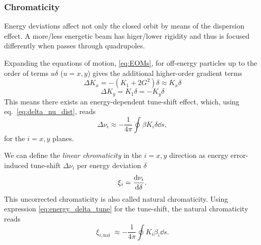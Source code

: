\subsubsection{Chromaticity}
Energy deviations affect not only the closed orbit by means of the dispersion effect. A more/less energetic beam has higer/lower rigidity and thus is focused differently when passes through quadrupoles.

Expanding the equations of motion, \eqref{eq:EOMs}, for off-energy particles up to the order of terms $u\delta$ ($u=x,y$) gives the additional higher-order gradient terms
\begin{equation}
    \Delta K_x = -(K_1+2G^2)\delta \approx K_x\delta
\end{equation}
\begin{equation}
    \Delta K_y = K_1\delta = -K_y\delta
\end{equation}
This means there exists an energy-dependent tune-shift effect, which, using eq.~\eqref{eq:delta_nu_dist}, reads
\begin{equation}
    \Delta \nu _i \approx -\frac{1}{4\pi}\oint\beta K_i \delta \dd{s},
    \label{eq:energy_delta_tune}
\end{equation}
for the $i=x,y$ planes.

We can define the \textit{linear chromaticity} in the $i=x,y$ direction as energy error-induced tune-shift $\Delta \nu_i$ per energy deviation $\delta$
\begin{equation}
    \xi_i=\dv{\nu_i}{\delta}.
\end{equation}
This uncorrected chromaticity is also called natural chromaticity. Using expression \eqref{eq:energy_delta_tune} for the tune-shift, the natural chromaticity reads
\begin{equation}
\xi_{i, \text {nat }} \approx-\frac{1}{4 \pi} \oint K_i \beta_i \dd{s}.
\end{equation}

